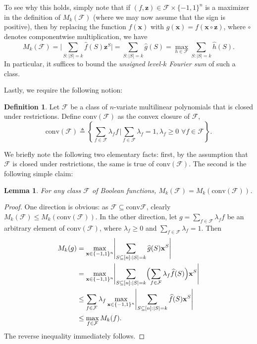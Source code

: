 \documentclass[10pt,a4paper]{article}
\newtheorem{lemma}[theorem]{Lemma}
\theoremstyle{definition}
\newtheorem{definition}[theorem]{Definition}
\begin{document}
To see why this holds, simply note that if $(f,\mathbf{z})\in \mathcal{F}\times \{-1,1\}^n$ is a maximizer in the definition of $M_k(\mathcal{F})$ (where we may now assume that the sign is positive), then by replacing the function $f(\mathbf{x})$ with $g(\mathbf{x})=f(\mathbf{x}\circ \mathbf{z})$, where $\circ$ denotes componentwise multiplication, we have 
\begin{equation*}
    M_k(\mathcal{F})
    = \Biggl| \sum_{S:\vert S\vert=k} \hat{f}(S)\mathbf{z}^S \Biggr|
    = \sum_{S:\vert S\vert=k} \hat{g}(S)=\max_{h\in \mathcal{F}} \sum_{S:\vert S\vert=k} \hat{h}(S).
\end{equation*}
In particular, it suffices to bound the \emph{unsigned level-$k$ Fourier sum} of such a class.

Lastly, we require the following notion:

\begin{definition}
Let $\mathcal{F}$ be a class of $n$-variate multilinear polynomials that is closed under restrictions.  Define $\mathrm{conv}(\mathcal{F})$ as the convex closure of $\mathcal{F}$,
\begin{equation*}
    \mathrm{conv}(\mathcal{F})\triangleq \left\{\sum_{f\in \mathcal{F}} \lambda_f f\,\bigg\vert \sum_{f\in \mathcal{F}} \lambda_f=1, \lambda_f\geq 0 \,\,\forall f\in \mathcal{F}\right\}.
\end{equation*}
\end{definition}
We briefly note the following two elementary facts: first, by the assumption that $\mathcal{F}$ is closed under restrictions, the same is true of $\mathrm{conv}(\mathcal{F})$. The second is the following simple claim:

\begin{lemma}
For any class $\mathcal{F}$ of Boolean functions, $M_k(\mathcal{F})=M_k(\mathrm{conv}(\mathcal{F}))$.
\end{lemma}
\begin{proof}
One direction is obvious: as $\mathcal{F}\subseteq \mathrm{conv}\mathcal{F}$, clearly $M_k(\mathcal{F})\leq M_k(\mathrm{conv}(\mathcal{F}))$. In the other direction, let $g=\sum_{f\in \mathcal{F}} \lambda_f f$ be an arbitrary element of $\mathrm{conv}(\mathcal{F})$, where $\lambda_f\geq 0$ and $\sum_{f\in \mathcal{F}}\lambda_f=1$. Then
\begin{align*}
    M_k(g) &= \max_{\mathbf{x}\in \{-1,1\}^n} \Biggl| \sum_{S\subseteq [n]:\vert S\vert=k} \widehat{g}(S) \mathbf{x}^S \Biggr| \\
    &=\max_{\mathbf{x}\in \{-1,1\}^n} \Biggl| \sum_{S\subseteq [n]:\vert S\vert=k} \Bigl( \sum_{f\in \mathcal{F}}\lambda_f\widehat{f}(S) \Bigr) \mathbf{x}^S \Biggr| \\
    &\leq \sum_{f\in \mathcal{F}} \lambda_f \max_{\mathbf{x}\in \{-1,1\}^n} \Biggl| \sum_{S\subseteq [n]:\vert S\vert=k} \widehat{f}(S) \mathbf{x}^S \Biggr| \\
    &\leq \max_{f\in \mathcal{F}} M_k(f).
\end{align*}
The reverse inequality immediately follows.
\end{proof}
\end{document}
